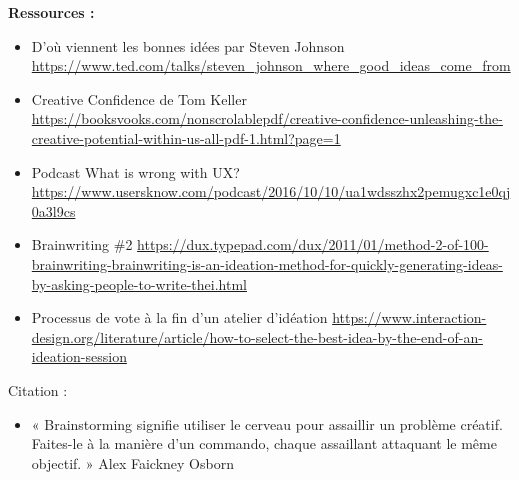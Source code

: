 \textbf{Ressources :}

\begin{itemize}
\item D'où viennent les bonnes idées par Steven Johnson \url{https://www.ted.com/talks/steven_johnson_where_good_ideas_come_from}
\item Creative Confidence de Tom Keller \url{https://booksvooks.com/nonscrolablepdf/creative-confidence-unleashing-the-creative-potential-within-us-all-pdf-1.html?page=1}
\item Podcast What is wrong with UX? \url{https://www.usersknow.com/podcast/2016/10/10/ua1wdsszhx2pemugxc1e0qj0a3l9cs}
\item Brainwriting \#2 \url{https://dux.typepad.com/dux/2011/01/method-2-of-100-brainwriting-brainwriting-is-an-ideation-method-for-quickly-generating-ideas-by-asking-people-to-write-thei.html}
\item Processus de vote à la fin d'un atelier d'idéation \url{https://www.interaction-design.org/literature/article/how-to-select-the-best-idea-by-the-end-of-an-ideation-session}
\end{itemize}

Citation :

\begin{itemize}
\item « Brainstorming signifie utiliser le cerveau pour assaillir un problème créatif. Faites-le à la manière d'un commando, chaque assaillant attaquant le même objectif. » Alex Faickney Osborn
\end{itemize}

